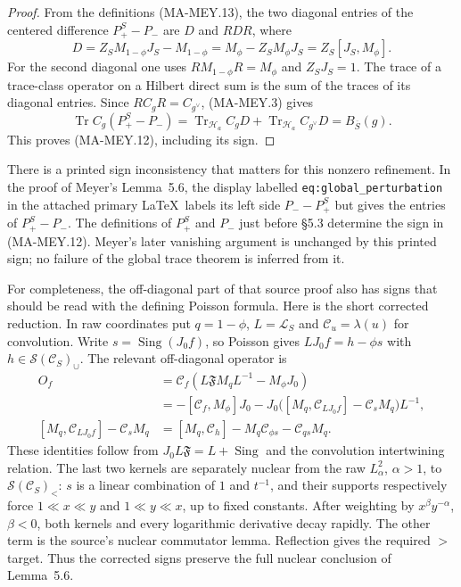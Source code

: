 \begin{proof}
From the definitions (MA-MEY.13), the two diagonal entries
of the centered difference $P_+^S-P_-$ are $D$ and $RDR$,
where
\[
 D=Z_SM_{1-\phi}J_S-M_{1-\phi}
   =M_\phi-Z_SM_\phi J_S=Z_S[J_S,M_\phi].
 \tag{MA-MEY.14}
\]
For the second diagonal one uses
$RM_{1-\phi}R=M_\phi$ and $Z_SJ_S=1$.
The trace of a trace-class operator on a Hilbert direct sum
is the sum of the traces of its diagonal entries.  Since
$RC_gR=C_{g^\vee}$, (MA-MEY.3) gives
\[
 \operatorname{Tr}C_g(P_+^S-P_-)
 =\operatorname{Tr}_{\mathcal H_a}C_gD
  +\operatorname{Tr}_{\mathcal H_a}C_{g^\vee}D
 =B_{\overline S}(g).
\]
This proves (MA-MEY.12), including its sign.
\end{proof}

There is a printed sign inconsistency that matters for this
nonzero refinement.  In the proof of Meyer's Lemma~5.6,
the display labelled \texttt{eq:global\_perturbation} in the
attached primary \LaTeX\ labels its left side $P_- -P_+^S$
but gives the entries of $P_+^S-P_-$.  The definitions of
$P_+^S$ and $P_-$ just before \S5.3 determine the sign in
(MA-MEY.12).  Meyer's later vanishing argument is unchanged
by this printed sign; no failure of the global trace theorem
is inferred from it.

For completeness, the off-diagonal part of that source proof
also has signs that should be read with the defining Poisson
formula. Here is the short corrected reduction. In raw
coordinates put $q=1-\phi$, $L=\mathcal L_S$ and
$\mathcal C_u=\lambda(u)$ for convolution. Write
$s=\operatorname{Sing}(J_0f)$, so Poisson gives
$LJ_0f=h-\phi s$ with $h\in\mathcal S(\mathcal C_S)_\cup$.
The relevant off-diagonal operator is
\[
 \begin{split}
 O_f&=\mathcal C_f
          (L\mathfrak F M_qL^{-1}-M_\phi J_0)\\
 &=-[\mathcal C_f,M_\phi]J_0
   -J_0\bigl([M_q,\mathcal C_{LJ_0f}]
                         -\mathcal C_sM_q\bigr)L^{-1},\\
 [M_q,\mathcal C_{LJ_0f}]-\mathcal C_sM_q
   &=[M_q,\mathcal C_h]
                  -M_q\mathcal C_{\phi s}-\mathcal C_{qs}M_q.
 \end{split}
\]
These identities follow from $J_0L\mathfrak F=L+\operatorname{Sing}$
and the convolution intertwining relation. The last two kernels
are separately nuclear from the raw $L^2_\alpha$, $\alpha>1$,
to $\mathcal S(\mathcal C_S)_{<}$: $s$ is a linear combination
of $1$ and $t^{-1}$, and their supports respectively force
$1\ll x\ll y$ and $1\ll y\ll x$, up to fixed constants.
After weighting by $x^\beta y^{-\alpha}$, $\beta<0$, both
kernels and every logarithmic derivative decay rapidly.
The other term is the source's nuclear commutator lemma.
Reflection gives the required $>$ target. Thus the corrected
signs preserve the full nuclear conclusion of Lemma~5.6.

